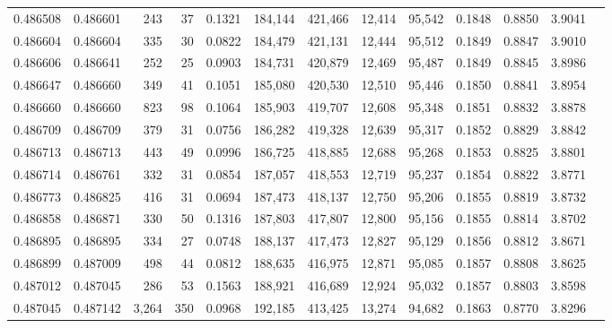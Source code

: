 \begin{tabular}{rrrrrrrrrrrrr}
0.486508 & 0.486601 &   243 &    37 &                                     0.1321 & 184,144 & 421,466 &  12,414 &  95,542 & 0.1848 & 0.8850 & 3.9041 \\
0.486604 & 0.486604 &   335 &    30 &                                     0.0822 & 184,479 & 421,131 &  12,444 &  95,512 & 0.1849 & 0.8847 & 3.9010 \\
0.486606 & 0.486641 &   252 &    25 &                                     0.0903 & 184,731 & 420,879 &  12,469 &  95,487 & 0.1849 & 0.8845 & 3.8986 \\
0.486647 & 0.486660 &   349 &    41 &                                     0.1051 & 185,080 & 420,530 &  12,510 &  95,446 & 0.1850 & 0.8841 & 3.8954 \\
0.486660 & 0.486660 &   823 &    98 &                                     0.1064 & 185,903 & 419,707 &  12,608 &  95,348 & 0.1851 & 0.8832 & 3.8878 \\
0.486709 & 0.486709 &   379 &    31 &                                     0.0756 & 186,282 & 419,328 &  12,639 &  95,317 & 0.1852 & 0.8829 & 3.8842 \\
0.486713 & 0.486713 &   443 &    49 &                                     0.0996 & 186,725 & 418,885 &  12,688 &  95,268 & 0.1853 & 0.8825 & 3.8801 \\
0.486714 & 0.486761 &   332 &    31 &                                     0.0854 & 187,057 & 418,553 &  12,719 &  95,237 & 0.1854 & 0.8822 & 3.8771 \\
0.486773 & 0.486825 &   416 &    31 &                                     0.0694 & 187,473 & 418,137 &  12,750 &  95,206 & 0.1855 & 0.8819 & 3.8732 \\
0.486858 & 0.486871 &   330 &    50 &                                     0.1316 & 187,803 & 417,807 &  12,800 &  95,156 & 0.1855 & 0.8814 & 3.8702 \\
0.486895 & 0.486895 &   334 &    27 &                                     0.0748 & 188,137 & 417,473 &  12,827 &  95,129 & 0.1856 & 0.8812 & 3.8671 \\
0.486899 & 0.487009 &   498 &    44 &                                     0.0812 & 188,635 & 416,975 &  12,871 &  95,085 & 0.1857 & 0.8808 & 3.8625 \\
0.487012 & 0.487045 &   286 &    53 &                                     0.1563 & 188,921 & 416,689 &  12,924 &  95,032 & 0.1857 & 0.8803 & 3.8598 \\
0.487045 & 0.487142 & 3,264 &   350 &                                     0.0968 & 192,185 & 413,425 &  13,274 &  94,682 & 0.1863 & 0.8770 & 3.8296 \\

\end{tabular}
